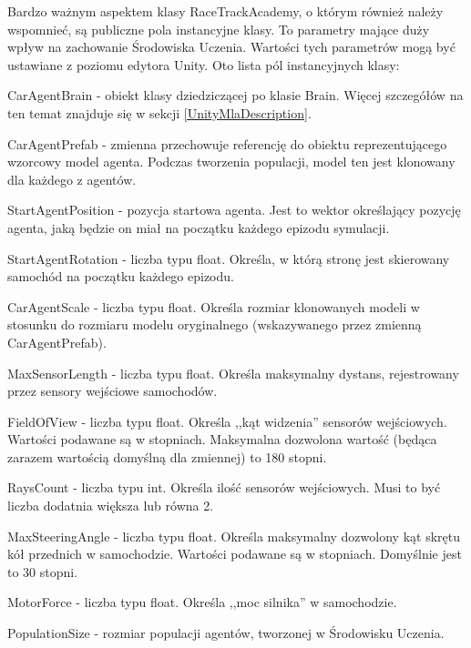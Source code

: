 Bardzo ważnym aspektem klasy RaceTrackAcademy, o którym również należy wspomnieć, są publiczne pola instancyjne klasy. 
To parametry mające duży wpływ na zachowanie Środowiska Uczenia. Wartości tych parametrów mogą być ustawiane z poziomu edytora Unity.
Oto lista pól instancyjnych klasy:
\begin{itemize*}
\item CarAgentBrain - obiekt klasy dziedziczącej po klasie Brain. Więcej szczegółów na ten temat znajduje się w sekcji \ref{UnityMlaDescription}.
\item CarAgentPrefab - zmienna przechowuje referencję do obiektu reprezentującego wzorcowy model agenta. Podczas tworzenia populacji, model ten jest klonowany dla każdego z agentów.
\item StartAgentPosition - pozycja startowa agenta. Jest to wektor określający pozycję agenta, jaką będzie on miał na początku każdego epizodu symulacji.
\item StartAgentRotation - liczba typu float. Określa, w którą stronę jest skierowany samochód na początku każdego epizodu.
\item CarAgentScale - liczba typu float. Określa rozmiar klonowanych modeli w stosunku do rozmiaru modelu oryginalnego (wskazywanego przez zmienną CarAgentPrefab).
\item MaxSensorLength - liczba typu float. Określa maksymalny dystans, rejestrowany przez sensory wejściowe samochodów.
\item FieldOfView - liczba typu float. Określa ,,kąt widzenia'' sensorów wejściowych. Wartości podawane są w stopniach. Maksymalna dozwolona wartość (będąca zarazem wartością domyślną dla zmiennej) to 180 stopni.
\item RaysCount - liczba typu int. Określa ilość sensorów wejściowych. Musi to być liczba dodatnia większa lub równa 2.
\item MaxSteeringAngle - liczba typu float. Określa maksymalny dozwolony kąt skrętu kół przednich w samochodzie. Wartości podawane są w stopniach. Domyślnie jest to 30 stopni.
\item MotorForce - liczba typu float. Określa ,,moc silnika'' w samochodzie.
\item PopulationSize - rozmiar populacji agentów, tworzonej w Środowisku Uczenia.
\end{itemize*}


